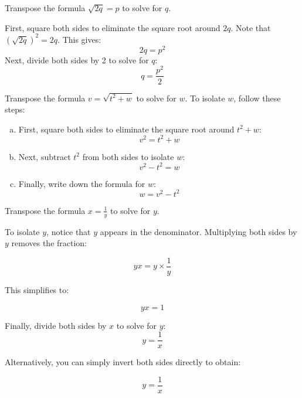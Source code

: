 \begin{example} Transpose the formula \(\sqrt{2q} = p\) to solve for \(q\).

\begin{solution}
   First, square both sides to eliminate the square root around \(2q\). Note that \((\sqrt{2q})^2 = 2q\). This gives:
\[
2q = p^2
\]
Next, divide both sides by 2 to solve for \(q\):
\[
q = \frac{p^2}{2}
\]   
\end{solution}
 
\end{example}



\begin{problem}
Transpose the formula \(v = \sqrt{t^2 + w}\) to solve for \(w\). To isolate \(w\), follow these steps:   
\end{problem}

    \begin{enumerate}[a.]
        \item First, square both sides to eliminate the square root around \(t^2 + w\):
        \[
        v^2 = t^2 + w
        \]

        \item Next, subtract \(t^2\) from both sides to isolate \(w\):
        \[
        v^2 - t^2 = w
        \]

        \item Finally, write down the formula for \(w\):
        \[
        w = v^2 - t^2
        \]
    \end{enumerate}

\begin{example} Transpose the formula \(x = \frac{1}{y}\) to solve for \(y\).

\begin{solution}
To isolate \(y\), notice that \(y\) appears in the denominator. Multiplying both sides by \(y\) removes the fraction:

\[
yx = y \times \frac{1}{y}
\]

This simplifies to:

\[
yx = 1
\]

Finally, divide both sides by \(x\) to solve for \(y\):
\[
y = \frac{1}{x}
\]

Alternatively, you can simply invert both sides directly to obtain:

\[
y = \frac{1}{x}
\]    
\end{solution}


\end{example}


